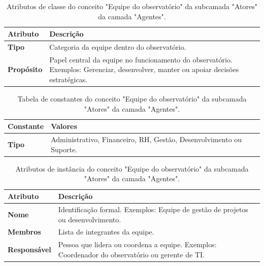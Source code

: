 \begin{apendicesenv}
\begin{table}[H]
\centering
\caption{Atributos de classe do conceito "Equipe do observatório" da subcamada "Atores" da camada "Agentes".}
\begin{tabularx}{\textwidth}{|l|X|X|}
\hline
\textbf{Atributo} & \textbf{Descrição} \\ \hline
\textbf{Tipo} & Categoria da equipe dentro do observatório. \\ \hline
\textbf{Propósito} & Papel central da equipe no funcionamento do observatório. Exemplos: Gerenciar, desenvolver, manter ou apoiar decisões estratégicas. \\ \hline
\end{tabularx}
\end{table}

\begin{table}[H]
\centering
\caption{Tabela de constantes do conceito "Equipe do observatório" da subcamada "Atores" da camada "Agentes".}
\begin{tabularx}{\textwidth}{|l|X|X|}
\hline
\textbf{Constante} & \textbf{Valores} \\ \hline
\textbf{Tipo} & Administrativo, Financeiro, RH, Gestão, Desenvolvimento ou Suporte. \\ \hline
\end{tabularx}
\end{table}

\begin{table}[H]
\centering
\caption{Atributos de instância do conceito "Equipe do observatório" da subcamada "Atores" da camada "Agentes".}
\begin{tabularx}{\textwidth}{|l|X|X|}
\hline
\textbf{Atributo} & \textbf{Descrição} \\ \hline
\textbf{Nome} & Identificação formal. Exemplos: Equipe de gestão de projetos ou desenvolvimento. \\ \hline
\textbf{Membros} & Lista de integrantes da equipe. \\ \hline
\textbf{Responsável} & Pessoa que lidera ou coordena a equipe. Exemplos: Coordenador do observatório ou gerente de TI. \\ \hline
\end{tabularx}
\end{table}


\end{apendicesenv}

